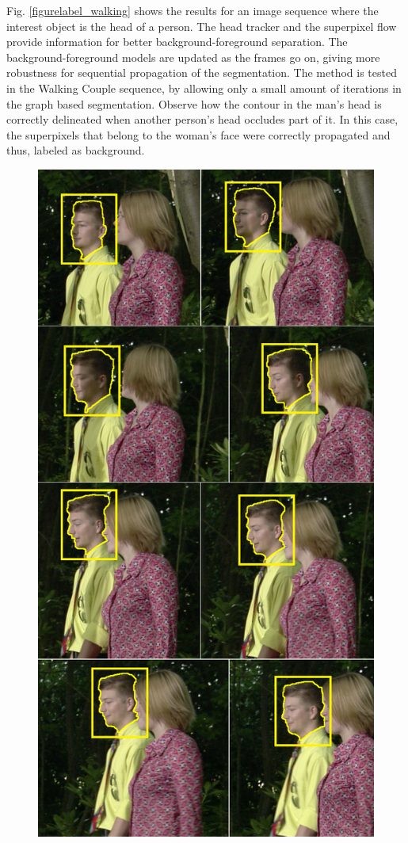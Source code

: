 Fig. \ref{figurelabel_walking} shows the results for an image sequence where the interest object is the head of a person.
The head tracker and the superpixel flow provide information for better background-foreground separation. The
background-foreground models are updated as the frames go on, giving more robustness for sequential
propagation of the segmentation. The method is tested in the Walking Couple sequence, by allowing only a small amount of iterations in the
graph based segmentation. Observe how the contour in the man's head is correctly delineated when
another person's head occludes part of it. In this case, the superpixels that belong to the woman’s face
were correctly propagated and thus, labeled as background. \\
   \begin{figure}[thpb]
      \centering
      \includegraphics[width=1.0\textwidth]{../images/Sequence2.png}

\end{figure}
